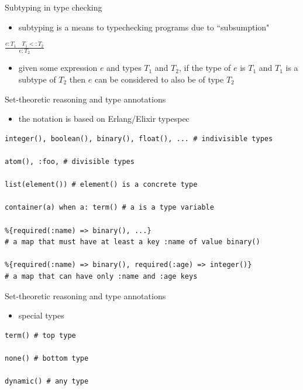 \documentclass[
  ignorenonframetext,
  aspectratio=169]{beamer}
\providecommand{\tightlist}{%
  \setlength{\itemsep}{0pt}\setlength{\parskip}{0pt}}
\begin{document}
\begin{frame}{Subtyping in type checking}
\label{subtyping-in-type-checking}
\begin{itemize}
\tightlist
\item
  subtyping is a means to typechecking programs due to ``subsumption"
\end{itemize}

\huge

\begin{center}
 $\frac{e : T_1 \quad T_1 <: T_2}{e : T_2}$
 \end{center}

\begin{itemize}
\tightlist
\item
  given some expression \(e\) and types \(T_1\) and \(T_2\), if the type
  of \(e\) is \(T_1\) and \(T_1\) is a subtype of \(T_2\) then \(e\) can
  be considered to also be of type \(T_2\)
\end{itemize}
\end{frame}

\begin{frame}[fragile]{Set-theoretic reasoning and type annotations}
\label{set-theoretic-reasoning-and-type-annotations}
\begin{itemize}
\tightlist
\item
  the notation is based on Erlang/Elixir typespec
\end{itemize}

\begin{lstlisting}
integer(), boolean(), binary(), float(), ... # indivisible types

atom(), :foo, # divisible types

list(element()) # element() is a concrete type

container(a) when a: term() # a is a type variable

%{required(:name) => binary(), ...}
# a map that must have at least a key :name of value binary()

%{required(:name) => binary(), required(:age) => integer()}
# a map that can have only :name and :age keys
\end{lstlisting}
\end{frame}

\begin{frame}[fragile]{Set-theoretic reasoning and type annotations}
\label{set-theoretic-reasoning-and-type-annotations-1}
\begin{itemize}
\tightlist
\item
  special types
\end{itemize}

\begin{lstlisting}
term() # top type

none() # bottom type

dynamic() # any type
\end{lstlisting}
\end{frame}
\end{document}
